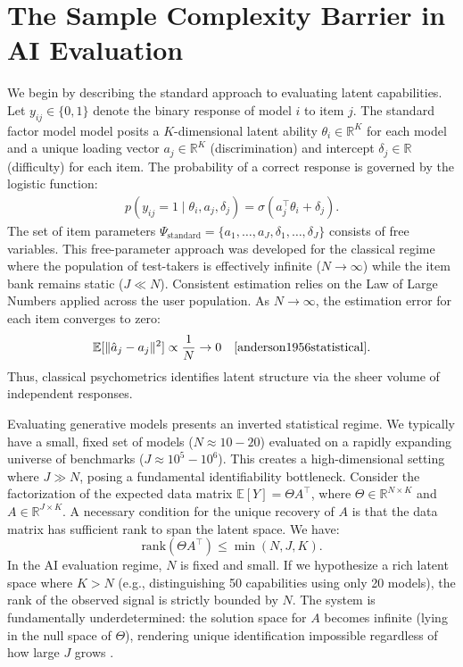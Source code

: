 \documentclass{article}
\theoremstyle{plain}
\theoremstyle{definition}
\theoremstyle{remark}
\begin{document}
\section{The Sample Complexity Barrier in AI Evaluation}
\label{sec:motivation}

We begin by describing the standard approach to evaluating latent capabilities. Let $y_{ij} \in \{0,1\}$ denote the binary response of model $i$ to item $j$. The standard factor model model posits a $K$-dimensional latent ability $\theta_i \in \mathbb{R}^K$ for each model and a unique loading vector $a_j \in \mathbb{R}^K$ (discrimination) and intercept $\delta_j \in \mathbb{R}$ (difficulty) for each item. The probability of a correct response is governed by the logistic function:
\begin{align}
    p(y_{ij} = 1 \mid \theta_i, a_j, \delta_j) = \sigma(a_j^\top \theta_i + \delta_j).
\end{align}
The set of item parameters $\Psi_{\text{standard}} = \{a_1, \dots, a_J, \delta_1, \dots, \delta_J\}$ consists of free variables. This free-parameter approach was developed for the classical regime where the population of test-takers is effectively infinite ($N \to \infty$) while the item bank remains static ($J \ll N$). Consistent estimation relies on the Law of Large Numbers applied across the user population. As $N \to \infty$, the estimation error for each item converges to zero:
\begin{align}
    \mathbb{E}[\|\hat{a}_j - a_j\|^2] \propto \frac{1}{N} \to 0 \quad \text{\cite{anderson1956statistical}}.
\end{align}
Thus, classical psychometrics identifies latent structure via the sheer volume of independent responses.

Evaluating generative models presents an inverted statistical regime. We typically have a small, fixed set of models ($N \approx 10-20$) evaluated on a rapidly expanding universe of benchmarks ($J \approx 10^5 - 10^6$). This creates a high-dimensional setting where $J \gg N$, posing a fundamental identifiability bottleneck. Consider the factorization of the expected data matrix $\mathbb{E}[Y] = \Theta A^\top$, where $\Theta \in \mathbb{R}^{N \times K}$ and $A \in \mathbb{R}^{J \times K}$. A necessary condition for the unique recovery of $A$ is that the data matrix has sufficient rank to span the latent space. We have:
\begin{equation}
    \text{rank}(\Theta A^\top) \le \min(N, J, K).
\end{equation}
In the AI evaluation regime, $N$ is fixed and small. If we hypothesize a rich latent space where $K > N$ (e.g., distinguishing 50 capabilities using only 20 models), the rank of the observed signal is strictly bounded by $N$. The system is fundamentally underdetermined: the solution space for $A$ becomes infinite (lying in the null space of $\Theta$), rendering unique identification impossible regardless of how large $J$ grows \cite{wainwright2019high}.
\end{document}
